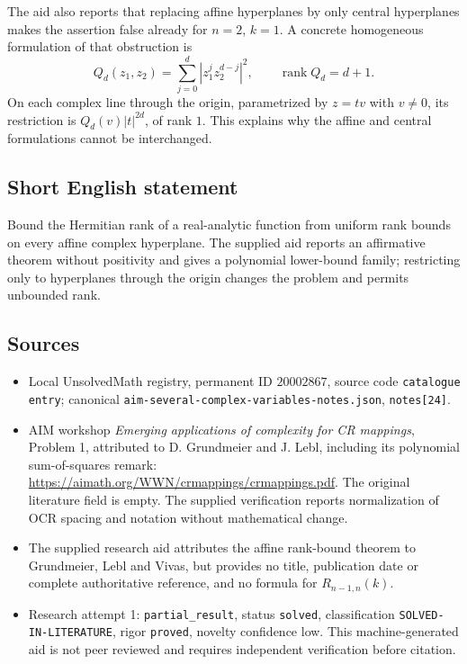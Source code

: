 \documentclass[11pt]{article}
\begin{document}
The aid also reports that replacing affine hyperplanes by only central hyperplanes makes the assertion false already for $n=2$, $k=1$. A concrete homogeneous formulation of that obstruction is
\[
Q_d(z_1,z_2)=\sum_{j=0}^d|z_1^jz_2^{d-j}|^2,\qquad\operatorname{rank}Q_d=d+1.
\]
On each complex line through the origin, parametrized by $z=tv$ with $v\ne0$, its restriction is $Q_d(v)|t|^{2d}$, of rank $1$. This explains why the affine and central formulations cannot be interchanged.
\subsection{Short English statement}
Bound the Hermitian rank of a real-analytic function from uniform rank bounds on every affine complex hyperplane. The supplied aid reports an affirmative theorem without positivity and gives a polynomial lower-bound family; restricting only to hyperplanes through the origin changes the problem and permits unbounded rank.
\subsection{Sources}
\begin{itemize}
\item Local UnsolvedMath registry, permanent ID $20002867$, source code \texttt{catalogue entry}; canonical \texttt{aim-several-complex-variables-notes.json}, \texttt{notes[24]}.
\item AIM workshop \emph{Emerging applications of complexity for CR mappings}, Problem 1, attributed to D. Grundmeier and J. Lebl, including its polynomial sum-of-squares remark: \url{https://aimath.org/WWN/crmappings/crmappings.pdf}. The original literature field is empty. The supplied verification reports normalization of OCR spacing and notation without mathematical change.
\item The supplied research aid attributes the affine rank-bound theorem to Grundmeier, Lebl and Vivas, but provides no title, publication date or complete authoritative reference, and no formula for $R_{n-1,n}(k)$.
\item Research attempt 1: \texttt{partial\_result}, status \texttt{solved}, classification \texttt{SOLVED-IN-LITERATURE}, rigor \texttt{proved}, novelty confidence low. This machine-generated aid is not peer reviewed and requires independent verification before citation.
\end{itemize}
\end{document}
